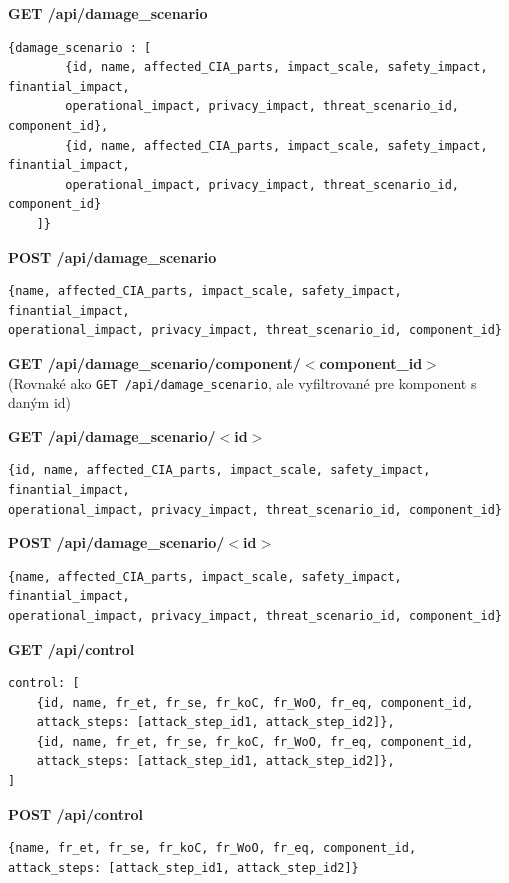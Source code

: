\documentclass[11pt]{article}
\begin{document}
\vspace{1cm}
\textbf{GET /api/damage\_scenario} 
\begin{verbatim}
{damage_scenario : [
		{id, name, affected_CIA_parts, impact_scale, safety_impact, finantial_impact, 
        operational_impact, privacy_impact, threat_scenario_id, component_id}, 
		{id, name, affected_CIA_parts, impact_scale, safety_impact, finantial_impact, 
        operational_impact, privacy_impact, threat_scenario_id, component_id}
	]}
\end{verbatim}

\vspace{1cm}
\textbf{POST /api/damage\_scenario} 
\begin{verbatim}
{name, affected_CIA_parts, impact_scale, safety_impact, finantial_impact, 
operational_impact, privacy_impact, threat_scenario_id, component_id}
\end{verbatim}

\vspace{1cm}
\textbf{GET /api/damage\_scenario/component/$<$component\_id$>$}\\ 
(Rovnaké ako \texttt{GET /api/damage\_scenario}, ale vyfiltrované pre komponent s daným id)

\vspace{1cm}
\textbf{GET /api/damage\_scenario/$<$id$>$} 
\begin{verbatim}
{id, name, affected_CIA_parts, impact_scale, safety_impact, finantial_impact, 
operational_impact, privacy_impact, threat_scenario_id, component_id}
\end{verbatim}

\vspace{1cm}
\textbf{POST /api/damage\_scenario/$<$id$>$} 
\begin{verbatim}
{name, affected_CIA_parts, impact_scale, safety_impact, finantial_impact, 
operational_impact, privacy_impact, threat_scenario_id, component_id}
\end{verbatim}

\vspace{1cm}
\textbf{GET /api/control} 
\begin{verbatim}
control: [
    {id, name, fr_et, fr_se, fr_koC, fr_WoO, fr_eq, component_id, 
    attack_steps: [attack_step_id1, attack_step_id2]},
    {id, name, fr_et, fr_se, fr_koC, fr_WoO, fr_eq, component_id, 
    attack_steps: [attack_step_id1, attack_step_id2]},
]
\end{verbatim}

\vspace{1cm}
\textbf{POST /api/control} 
\begin{verbatim}
{name, fr_et, fr_se, fr_koC, fr_WoO, fr_eq, component_id, 
attack_steps: [attack_step_id1, attack_step_id2]}
\end{verbatim}
\end{document}
